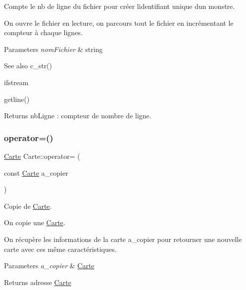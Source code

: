 Compte le nb de ligne du fichier pour créer l\textquotesingle{}identifiant unique d\textquotesingle{}un monstre.

On ouvre le fichier en lecture, on parcours tout le fichier en incrémentant le compteur à chaque lignes.


\begin{DoxyParams}{Parameters}
{\em nom\+Fichier} & string \\
\hline
\end{DoxyParams}
\begin{DoxySeeAlso}{See also}
c\+\_\+str() 

ifstream 

getline() 
\end{DoxySeeAlso}
\begin{DoxyReturn}{Returns}
nb\+Ligne \+: compteur de nombre de ligne. 
\end{DoxyReturn}
\mbox{\label{class_carte_a4878501e2a178dd862471666b013f270}} 
\subsubsection{\texorpdfstring{operator=()}{operator=()}}
{\footnotesize\ttfamily \hyperlink{class_carte}{Carte} Carte\+::operator= (\begin{DoxyParamCaption}\item[{const \hyperlink{class_carte}{Carte}}]{a\+\_\+copier }\end{DoxyParamCaption})}



Copie de \hyperlink{class_carte}{Carte}. 

On copie une \hyperlink{class_carte}{Carte}.

On récupère les informations de la carte a\+\_\+copier pour retourner une nouvelle carte avec ces même caractéristiques.


\begin{DoxyParams}{Parameters}
{\em a\+\_\+copier} & \hyperlink{class_carte}{Carte} \\
\hline
\end{DoxyParams}
\begin{DoxyReturn}{Returns}
adresse \hyperlink{class_carte}{Carte} 
\end{DoxyReturn}
\mbox{\label{class_carte_a0d325c0712010f2e02172fedbb4fcbe1}} 
